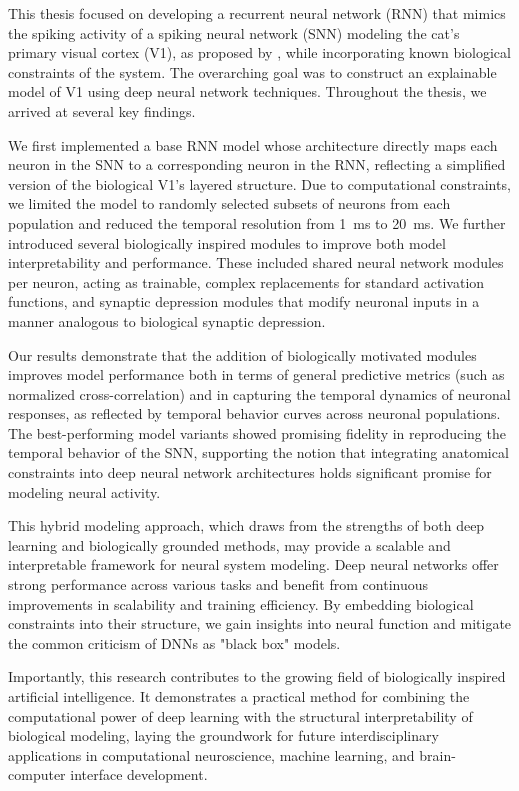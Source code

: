 

This thesis focused on developing a recurrent neural network (RNN) that mimics the spiking activity of a spiking neural network (SNN) modeling the cat's primary visual cortex (V1), as proposed by \citet{antolik2024comprehensive}, while incorporating known biological constraints of the system. The overarching goal was to construct an explainable model of V1 using deep neural network techniques. Throughout the thesis, we arrived at several key findings.

We first implemented a base RNN model whose architecture directly maps each neuron in the SNN to a corresponding neuron in the RNN, reflecting a simplified version of the biological V1's layered structure. Due to computational constraints, we limited the model to randomly selected subsets of neurons from each population and reduced the temporal resolution from 1~ms to 20~ms. We further introduced several biologically inspired modules to improve both model interpretability and performance. These included shared neural network modules per neuron, acting as trainable, complex replacements for standard activation functions, and synaptic depression modules that modify neuronal inputs in a manner analogous to biological synaptic depression.

Our results demonstrate that the addition of biologically motivated modules improves model performance both in terms of general predictive metrics (such as normalized cross-correlation) and in capturing the temporal dynamics of neuronal responses, as reflected by temporal behavior curves across neuronal populations. The best-performing model variants showed promising fidelity in reproducing the temporal behavior of the SNN, supporting the notion that integrating anatomical constraints into deep neural network architectures holds significant promise for modeling neural activity.

This hybrid modeling approach, which draws from the strengths of both deep learning and biologically grounded methods, may provide a scalable and interpretable framework for neural system modeling. Deep neural networks offer strong performance across various tasks and benefit from continuous improvements in scalability and training efficiency. By embedding biological constraints into their structure, we gain insights into neural function and mitigate the common criticism of DNNs as "black box" models.

Importantly, this research contributes to the growing field of biologically inspired artificial intelligence. It demonstrates a practical method for combining the computational power of deep learning with the structural interpretability of biological modeling, laying the groundwork for future interdisciplinary applications in computational neuroscience, machine learning, and brain-computer interface development.

